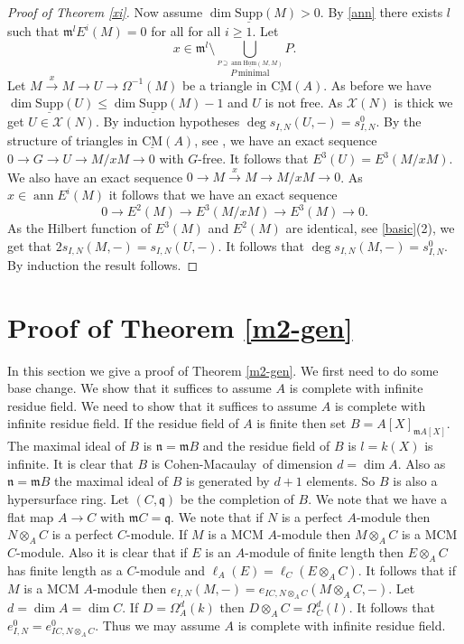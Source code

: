 \documentclass{amsart}
\newcommand{\CM}{Cohen-Macaulay}
\newcommand{\n}{\mathfrak{n} }
\newcommand{\m}{\mathfrak{m} }
\newcommand{\q}{\mathfrak{q} }
\newcommand{\X}{\mathcal{X} }
\newcommand{\rt}{\rightarrow}
\newcommand{\Om}{\Omega}
\newcommand{\ann}{\operatorname{ann}}
\newcommand{\Supp}{\operatorname{\underline{Supp}}}
\newcommand{\CMS}{\operatorname{\underline{CM}}}
\newcommand{\sHom}{\operatorname{\underline{Hom}}}
\theoremstyle{plain}
\theoremstyle{definition}
\theoremstyle{remark}
\begin{document}
\begin{proof}[Proof of Theorem \ref{xi}]
Now assume $\dim \Supp(M) > 0$.
By \ref{ann} there exists $l$ such that $\m^l E^i(M) = 0$ for all  for all $i \geq 1$.
Let
$$x \in \m^l \setminus \bigcup_{ \stackrel{P \supseteq \ann \sHom(M, M)}{P \ \text{minimal}}} P.$$
Let $M \xrightarrow{x} M \rt U \rt \Om^{-1}(M)$ be a triangle in $\CMS(A)$. As before we have $\dim \Supp(U) \leq \dim \Supp(M) -1$ and $U$ is not free. As $\X(N)$ is thick we get $U \in \X(N)$. By induction hypotheses  $\deg s_{I,N}(U, -) = s_{I, N}^0$. By the structure of triangles in $\CMS(A)$, see \cite[4.4.1]{Buchw}, we have an exact sequence
$0 \rt G \rt U \rt M/xM \rt 0$ with $G$-free. It follows that $E^3(U) = E^3(M/xM)$. We also have an exact sequence
$0 \rt M \xrightarrow{x} M \rt M/xM \rt 0$. As $x \in \ann E^i(M)$ it follows that we have an exact sequence
$$ 0 \rt E^2(M) \rt E^3(M/xM) \rt E^3(M) \rt 0.$$
As the Hilbert function of $E^3(M)$ and $E^2(M)$ are identical, see \ref{basic}(2), we get that
$2  s_{I,N}(M, -) = s_{I,N}(U, -)$. It follows that $\deg s_{I,N}(M, -) = s_{I, N}^0$. By induction the result follows.
\end{proof}


\section{Proof of Theorem \ref{m2-gen} }
In this section we give a proof of Theorem \ref{m2-gen}. We first need to do some base change. We show that it suffices to assume $A$ is complete with infinite residue field.
\s\label{bc} We need to show that it suffices to assume $A$ is complete with infinite residue field. If the residue field of $A$ is finite then set $B = A[X]_{\m A[X]}$. The maximal ideal of $B$ is $\n = \m B$ and the residue field of $B$ is $l = k(X)$ is infinite. It is clear that $B$ is \CM \ of dimension $d = \dim A$. Also as $\n = \m B$ the maximal ideal of $B$ is generated by $d + 1$ elements.  So $B$ is also a hypersurface ring. Let $(C, \q)$ be the completion of $B$.  We note that we have a flat map $A \rt C$ with $\m C = \q$. We note that if $N$ is a perfect $A$-module then
$N\otimes_A C$ is a perfect $C$-module. If $M$ is a MCM $A$-module then $M\otimes_A C$ is a MCM $C$-module. Also it is clear that if $E$ is an $A$-module of finite length then $E\otimes_A C$ has finite length as a $C$-module and $\ell_A(E) = \ell_C(E\otimes_A C)$. It follows that if $M$ is a MCM $A$-module then
$e_{I,N}(M, -) = e_{IC,N\otimes_A C}(M\otimes_A C, -)$. Let $d = \dim A = \dim C$. If $D = \Omega^d_A(k)$ then $D \otimes_A C = \Omega^d_C(l)$. It follows that $e^0_{I, N} = e^0_{IC, N\otimes_A C}$. Thus we may assume $A$ is complete with infinite residue field.
\end{document}
